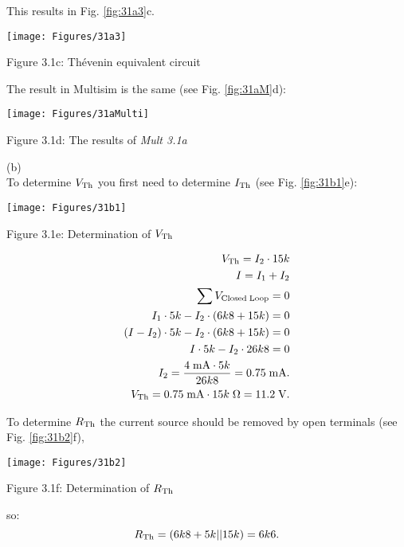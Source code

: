 \noindent This results in Fig. \ref{fig:31a3}c.
\begin{center}
    \texttt{[image: Figures/31a3]}	
 
    Figure 3.1c: Th\'{e}venin equivalent circuit	  
    \label{fig:31a3} 
\end{center}

\newpage
\noindent The result in Multisim is the same (see Fig. \ref{fig:31aM}d):
\begin{center}
    \texttt{[image: Figures/31aMulti]}	
 
    Figure 3.1d: The results of \textit{Mult 3.1a}	  
    \label{fig:31aM} 
\end{center}

\noindent (b) \\
To determine $V_{\rm Th}$ you first need to determine $I_{\rm Th}$ (see Fig. \ref{fig:31b1}e):
\begin{center}
    \texttt{[image: Figures/31b1]}	
 
    Figure 3.1e: Determination of $V_{\rm Th}$	  
    \label{fig:31b1} 
\end{center}

\begin{equation}
\begin{split}
V_{\rm Th} = I_2 \cdot 15k \\
I = I_1 + I_2 \\
\sum V_{\rm Closed \; Loop} = 0 \\
I_1 \cdot 5k - I_2 \cdot (6k8 + 15k) = 0 \\
(I - I_2) \cdot 5k - I_2 \cdot (6k8 + 15k) = 0 \\
I \cdot 5k - I_2 \cdot 26k8 = 0 \\
I_2 = \frac{4 \; {\rm mA} \cdot 5k}{26k8} = 0.75 \; {\rm mA}. \\
V_{\rm Th} = 0.75 \; {\rm mA} \cdot 15k \; \Omega = 11.2 \; {\rm V}.
\end{split}
\end{equation}
 
\noindent To determine $R_{\rm Th}$ the current source should be removed by open terminals (see Fig. \ref{fig:31b2}f), 
\begin{center}
    \texttt{[image: Figures/31b2]}	
 
    Figure 3.1f: Determination of $R_{\rm Th}$	  
    \label{fig:31b2} 
\end{center}

\noindent so:
\begin{equation}
R_{\rm Th} = (6k8 +5k || 15k) = 6k6.
\end{equation}
 
